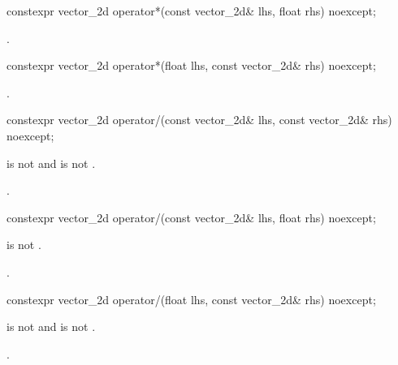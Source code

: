 %
\begin{itemdecl}
constexpr vector_2d operator*(const vector_2d& lhs, float rhs) noexcept;
\end{itemdecl}
\begin{itemdescr}
\pnum
\returns
{}.
\end{itemdescr}

%
\begin{itemdecl}
constexpr vector_2d operator*(float lhs, const vector_2d& rhs) noexcept;
\end{itemdecl}
\begin{itemdescr}
\pnum
\returns
{}.
\end{itemdescr}

%
\begin{itemdecl}
constexpr vector_2d operator/(const vector_2d& lhs, const vector_2d& rhs) 
  noexcept;
\end{itemdecl}
\begin{itemdescr}
\pnum
\requires
{} is not  and  is not .

\pnum
\returns
{}.
\end{itemdescr}

%
\begin{itemdecl}
constexpr vector_2d operator/(const vector_2d& lhs, float rhs) noexcept;
\end{itemdecl}
\begin{itemdescr}
\pnum
\requires
{} is not .

\pnum
\returns
{}.
\end{itemdescr}

%
\begin{itemdecl}
constexpr vector_2d operator/(float lhs, const vector_2d& rhs) noexcept;
\end{itemdecl}
\begin{itemdescr}
\pnum
\requires
{} is not  and  is not .

\pnum
\returns
{}.
\end{itemdescr}
